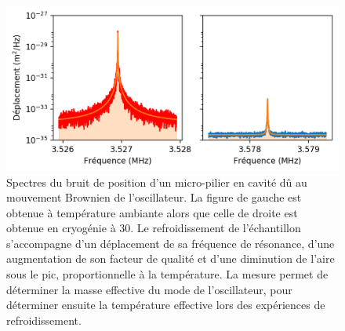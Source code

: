 \documentclass[12pt,a4paper]{article}
\begin{document}
\begin{figure}
\center
\includegraphics[scale=0.75]{figures/thermal_peak_def_filled.png}
\caption{Spectres du bruit de position d'un micro-pilier en cavité dû au mouvement Brownien de l'oscillateur.
La figure de gauche est obtenue à température ambiante alors que celle de droite est obtenue en cryogénie à \unit{30}{\milli\kelvin}.
Le refroidissement de l'échantillon s'accompagne d'un déplacement de sa fréquence de résonance, d'une augmentation de son facteur de qualité et d'une diminution de l'aire sous le pic, proportionnelle à la température.
La mesure permet de déterminer la masse effective du mode de l'oscillateur, pour déterminer ensuite la température effective lors des expériences de refroidissement.}
\label{fig:thermal_noise}
\end{figure}
\end{document}
